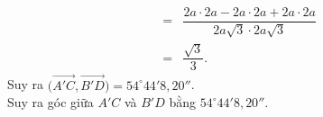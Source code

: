\begin{bt}
{\begin{enumerate}
\begin{eqnarray*}
				&=&\dfrac{2a\cdot 2a-2a\cdot 2a+2a\cdot 2a}{2a\sqrt 3\cdot 2a\sqrt 3}\\
				&=&\dfrac{\sqrt 3}{3}.
			\end{eqnarray*}
			Suy ra $\Big(\overrightarrow{A'C},\overrightarrow{B'D}\Big)=54^\circ44'8{,}20''$.\\
			Suy ra góc giữa $A'C$ và $B'D$ bằng $54^\circ44'8{,}20''$.
		\end{enumerate}
	}
\end{bt}

